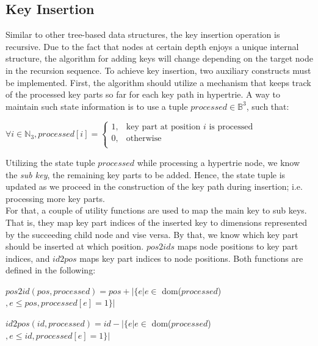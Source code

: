 \clearpage

\subsection{Key Insertion} 
Similar to other tree-based data structures, the key insertion operation is recursive. Due to the fact that nodes at certain depth enjoys a unique  internal structure, the algorithm for adding keys will change depending on the target node in the recursion sequence. To achieve key insertion, two auxiliary constructs must be implemented. First, the algorithm should utilize a mechanism that keeps track of the processed key parts so far for each key path in hypertrie. A way to maintain such state information is to use a tuple $processed \in \mathbb{B}^3$, such that:\\

\centerline{$\forall i \in \mathbb{N}_3 , processed[i] = \left\{ \begin{array}{rc} 1, & \mbox{key part at position }i\mbox{ is processed} \\ 0,  & \mbox{otherwise} \\ \end{array} \right.$}

\hspace{2cm}

Utilizing the state tuple $processed$ while processing a hypertrie node, we know the \textit{sub key}, the remaining key parts to be added. Hence, the state tuple is updated as we proceed in the construction of the key path during insertion; i.e. processing more key parts. \\

 For that, a couple of utility functions are used to map the main key to sub keys. That is, they map key part indices of the inserted key to dimensions represented by the succeeding child node and vise versa. By that, we know which key part should be inserted at which position. $pos2ids$ maps node positions to key part indices, and $id2pos$ maps key part indices to node positions. Both functions are defined in the following:\\
 
 \centerline{$pos2id(pos, processed) = pos + |\{e | e \in$ dom($processed$)$, e \leq pos, processed[e] = 1\}|$}
 \hspace{2cm}
 
 \centerline{$id2pos(id, processed) = id - |\{e | e \in$ dom($processed$)$, e \leq id, processed[e] = 1\}|$}
 \hspace{2cm}
 
